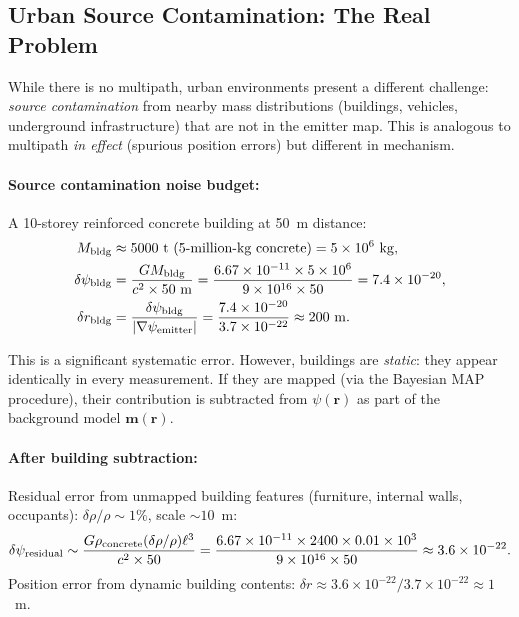 \documentclass[aps,prd,twocolumn,superscriptaddress,nofootinbib]{revtex4-2}
\begin{document}
\subsection{Urban Source Contamination: The Real Problem}

While there is no multipath, urban environments present a different
challenge: \emph{source contamination} from nearby mass distributions
(buildings, vehicles, underground infrastructure) that are not in the
emitter map.  This is analogous to multipath \emph{in effect}
(spurious position errors) but different in mechanism.

\paragraph{Source contamination noise budget:}
A 10-storey reinforced concrete building at 50~m distance:
\begin{align}
  M_{\rm bldg} &\approx 5000~\mathrm{t}~\text{(5-million-kg concrete)} = 5\times10^6~\mathrm{kg}, \\
  \delta\psi_{\rm bldg} &= \frac{GM_{\rm bldg}}{c^2 \times 50~\mathrm{m}}
  = \frac{6.67\times10^{-11}\times5\times10^6}{9\times10^{16}\times50}
  = 7.4\times10^{-20}, \\
  \delta r_{\rm bldg} &= \frac{\delta\psi_{\rm bldg}}{|\nabla\psi_{\rm emitter}|}
  = \frac{7.4\times10^{-20}}{3.7\times10^{-22}}
  \approx 200~\mathrm{m}.
\end{align}

This is a significant systematic error.  However, buildings are
\emph{static}: they appear identically in every measurement.  If they
are mapped (via the Bayesian MAP procedure), their contribution is
subtracted from $\psi(\mathbf{r})$ as part of the background model
$\mathbf{m}(\mathbf{r})$.

\paragraph{After building subtraction:}
Residual error from unmapped building features (furniture, internal walls,
occupants): $\delta\rho/\rho \sim 1\%$, scale $\sim 10$~m:
\begin{equation}
  \delta\psi_{\rm residual} \sim \frac{G\rho_{\rm concrete}
  (\delta\rho/\rho)\ell^3}{c^2 \times 50}
  = \frac{6.67\times10^{-11}\times2400\times0.01\times10^3}
  {9\times10^{16}\times50}
  \approx 3.6\times10^{-22}.
  \label{eq:urban-residual}
\end{equation}
Position error from dynamic building contents:
$\delta r \approx 3.6\times10^{-22}/3.7\times10^{-22} \approx 1$~m.
\end{document}
